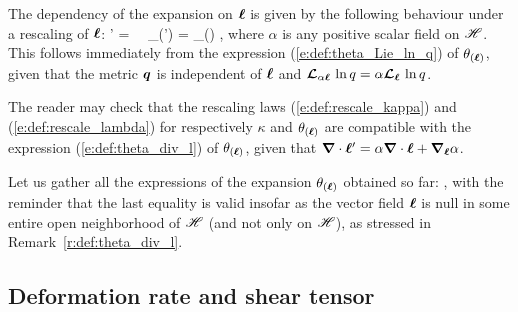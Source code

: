 The dependency of the expansion on $\bm{\ell}$ is given by the following
behaviour under a rescaling of $\bm{\ell}$:
\be \label{e:def:rescale_lambda}
   \wl' = \alpha \wl \ \Longrightarrow \ \theta_{(\wl')} = \alpha \theta_{(\wl)} ,
\ee
where $\alpha$ is any positive scalar field on $\mathscr{H}$. This follows immediately
from the expression (\ref{e:def:theta_Lie_ln_q}) of $\theta_{(\bm{\ell})}$, given
that the metric $\bm{q}$ is independent of $\bm{\ell}$ and
$\bm{\mathcal{L}}_{\alpha\bm{\ell}}\,\ln q = \alpha \bm{\mathcal{L}}_{\bm{\bm{\ell}}}\,\ln q$.
\begin{remark}
The reader may check that the rescaling laws (\ref{e:def:rescale_kappa})
and (\ref{e:def:rescale_lambda}) for respectively $\kappa$ and $\theta_{(\bm{\ell})}$
are compatible with the expression (\ref{e:def:theta_div_l}) of $\theta_{(\bm{\ell})}$,
given that $\bm{\nabla}\cdot \bm{\ell}' = \alpha\bm{\nabla}\cdot\bm{\ell} + \bm{\nabla}_{\bm{\ell}} \alpha$.
\end{remark}

Let us gather all the expressions of the expansion $\theta_{(\bm{\ell})}$ obtained
so far:
\be \label{e:def:theta_l_all}
     ,
\ee
with the reminder that the last equality is valid insofar as the vector field $\bm{\ell}$ is
null in some entire open neighborhood of $\mathscr{H}$ (and not only on $\mathscr{H}$), as
stressed in Remark~\ref{r:def:theta_div_l}.

\subsection{Deformation rate and shear tensor} \label{s:def:deformation_shear}

